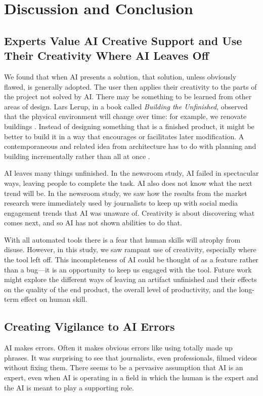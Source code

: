 \section{Discussion and Conclusion}
\subsection{Experts Value AI Creative Support and Use Their Creativity Where AI Leaves Off}

We found that when AI presents a solution, that solution, unless obviously flawed, is generally adopted. 
The user then applies their creativity to the parts of the project not solved by AI. 
There may be something to be learned from other areas of design.
Lars Lerup, in a book called \emph{Building the Unfinished}, observed that the physical environment will change over time: for example, we renovate buildings \cite{lerup1977building}. 
Instead of designing something that is a finished product, it might be better to build it in a way that encourages or facilitates later modification. 
A contemporaneous and related idea from architecture has to do with planning and building incrementally rather than all at once \cite{alexander1977pattern}.

AI leaves many things unfinished. 
In the newsroom study, AI failed in spectacular ways, leaving people to complete the task. 
AI also does not know what the next trend will be. 
In the newsroom study, we saw how the results from the market research were immediately used by journalists to keep up with social media engagement trends that AI was unaware of. 
Creativity is about discovering what comes next, and so AI has not shown abilities to do that.

With all automated tools there is a fear that human skills will atrophy from disuse. 
However, in this study, we saw rampant use of creativity, especially where the tool left off. 
This incompleteness of AI could be thought of as a feature rather than a bug---it is an opportunity to keep us engaged with the tool. 
Future work might explore the different ways of leaving an artifact unfinished and their effects on the quality of the end product, the overall level of productivity, and the long-term effect on human skill. 

\subsection{Creating Vigilance to AI Errors}
AI makes errors. 
Often it makes obvious errors like using totally made up phrases. It was surprising to see that journalists, even professionals, filmed videos without fixing them. 
There seems to be a pervasive assumption that AI is an expert, even when AI is operating in a field in which the human is the expert and the AI is meant to play a supporting role. 

